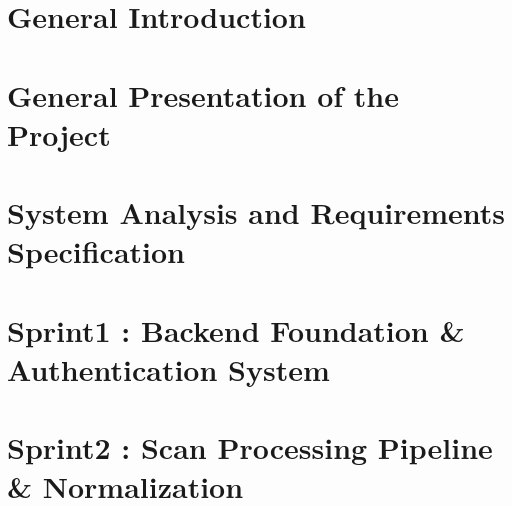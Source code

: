 \documentclass[12pt,a4paper]{report}
\begin{document}


\clearpage
{}
\setcounter{page}{1}



\clearpage


\clearpage


\clearpage


\clearpage
\listoffigures
\thispagestyle{plain}

\clearpage
\listoftables
\thispagestyle{plain}

\clearpage
{}
\setcounter{page}{1}

\chapter*{General Introduction}


\chapter{General Presentation of the Project}


\chapter{System Analysis and Requirements Specification}


\chapter{Sprint1 : Backend Foundation \& Authentication System}


\chapter{Sprint2 : Scan Processing Pipeline \& Normalization }

\end{document}
